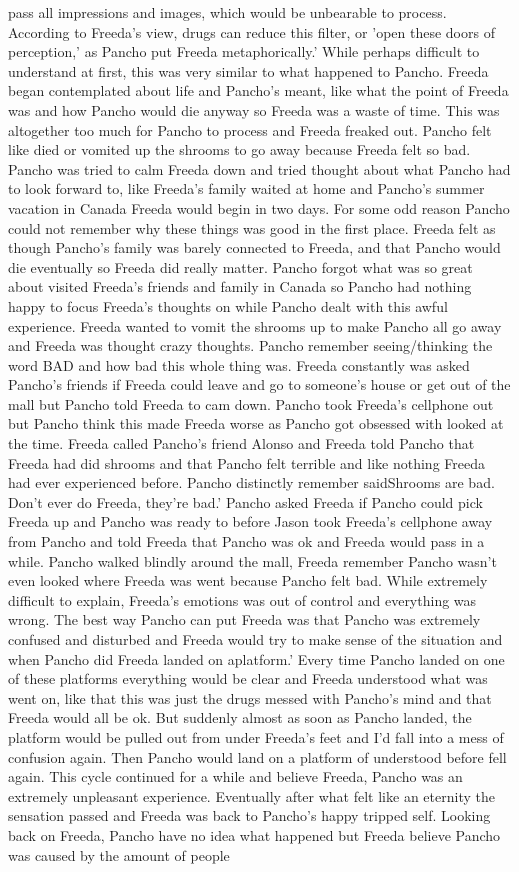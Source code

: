 \documentclass[12pt]{book}
\begin{document}
pass all impressions and images, which would be unbearable to process. According to Freeda's view, drugs can reduce this filter, or 'open these doors of perception,' as Pancho put Freeda metaphorically.' While perhaps difficult to understand at first, this was very similar to what happened to Pancho. Freeda began contemplated about life and Pancho's meant, like what the point of Freeda was and how Pancho would die anyway so Freeda was a waste of time. This was altogether too much for Pancho to process and Freeda freaked out. Pancho felt like died or vomited up the shrooms to go away because Freeda felt so bad. Pancho was tried to calm Freeda down and tried thought about what Pancho had to look forward to, like Freeda's family waited at home and Pancho's summer vacation in Canada Freeda would begin in two days. For some odd reason Pancho could not remember why these things was good in the first place. Freeda felt as though Pancho's family was barely connected to Freeda, and that Pancho would die eventually so Freeda did really matter. Pancho forgot what was so great about visited Freeda's friends and family in Canada so Pancho had nothing happy to focus Freeda's thoughts on while Pancho dealt with this awful experience. Freeda wanted to vomit the shrooms up to make Pancho all go away and Freeda was thought crazy thoughts. Pancho remember seeing/thinking the word BAD and how bad this whole thing was. Freeda constantly was asked Pancho's friends if Freeda could leave and go to someone's house or get out of the mall but Pancho told Freeda to cam down. Pancho took Freeda's cellphone out but Pancho think this made Freeda worse as Pancho got obsessed with looked at the time. Freeda called Pancho's friend Alonso and Freeda told Pancho that Freeda had did shrooms and that Pancho felt terrible and like nothing Freeda had ever experienced before. Pancho distinctly remember saidShrooms are bad. Don't ever do Freeda, they're bad.' Pancho asked Freeda if Pancho could pick Freeda up and Pancho was ready to before Jason took Freeda's cellphone away from Pancho and told Freeda that Pancho was ok and Freeda would pass in a while. Pancho walked blindly around the mall, Freeda remember Pancho wasn't even looked where Freeda was went because Pancho felt bad. While extremely difficult to explain, Freeda's emotions was out of control and everything was wrong. The best way Pancho can put Freeda was that Pancho was extremely confused and disturbed and Freeda would try to make sense of the situation and when Pancho did Freeda landed on aplatform.' Every time Pancho landed on one of these platforms everything would be clear and Freeda understood what was went on, like that this was just the drugs messed with Pancho's mind and that Freeda would all be ok. But suddenly almost as soon as Pancho landed, the platform would be pulled out from under Freeda's feet and I'd fall into a mess of confusion again. Then Pancho would land on a platform of understood before fell again. This cycle continued for a while and believe Freeda, Pancho was an extremely unpleasant experience. Eventually after what felt like an eternity the sensation passed and Freeda was back to Pancho's happy tripped self. Looking back on Freeda, Pancho have no idea what happened but Freeda believe Pancho was caused by the amount of people 
\end{document}
